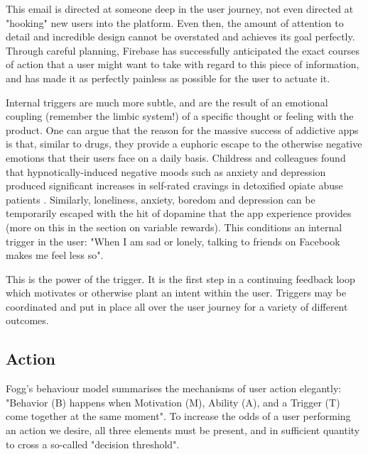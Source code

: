 This email is directed at someone deep in the user journey, not even directed at "hooking" new users into the platform. Even then, the amount of attention to detail and incredible design cannot be overstated and achieves its goal perfectly. Through careful planning, Firebase has successfully anticipated the exact courses of action that a user might want to take with regard to this piece of information, and has made it as perfectly painless as possible for the user to actuate it.

Internal triggers are much more subtle, and are the result of an emotional coupling (remember the limbic system!) of a specific thought or feeling with the product. One can argue that the reason for the massive success of addictive apps is that, similar to drugs, they provide a euphoric escape to the otherwise negative emotions that their users face on a daily basis. Childress and colleagues found that hypnotically-induced negative moods such as anxiety and depression produced significant increases in self-rated cravings in detoxified opiate abuse patients \cite{childress1994can}. Similarly, loneliness, anxiety, boredom and depression can be temporarily escaped with the hit of dopamine that the app experience provides (more on this in the section on variable rewards). This conditions an internal trigger in the user: "When I am sad or lonely, talking to friends on Facebook makes me feel less so".

This is the power of the trigger. It is the first step in a continuing feedback loop which motivates or otherwise plant an intent within the user. Triggers may be coordinated and put in place all over the user journey for a variety of different outcomes.

\subsection{Action}
Fogg's behaviour model \cite{fogg2009behavior} summarises the mechanisms of user action elegantly: "Behavior (B) happens when Motivation (M), Ability (A), and a Trigger (T) come together at the same moment". To increase the odds of a user performing an action we desire, all three elements must be present, and in sufficient quantity to cross a so-called "decision threshold".

